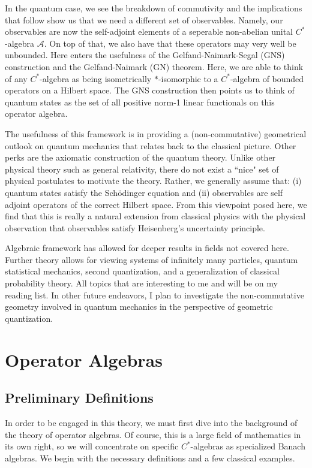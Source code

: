 \documentclass[leqno]{article}
\theoremstyle{definition}
\theoremstyle{remark}
\theoremstyle{theorem}
\begin{document}
In the quantum case, we see the breakdown of commutivity and the implications that follow show us that we need a different set of observables.  Namely, our observables are now the self-adjoint elements of a seperable non-abelian unital $C^*$-algebra $\mathcal{A}$. On top of that, we also have that these operators may very well be unbounded.  Here enters the usefulness of the Gelfand-Naimark-Segal (GNS) construction and the Gelfand-Naimark (GN) theorem.  Here, we are able to think of any $C^*$-algebra as being isometrically $*$-isomorphic to a $C^*$-algebra of bounded operators on a Hilbert space. The GNS construction then points us to think of quantum states as the set of all positive norm-1 linear functionals on this operator algebra. 

The usefulness of this framework is in providing a (non-commutative) geometrical outlook on quantum mechanics that relates back to the classical picture.  Other perks are the axiomatic construction of the quantum theory.  Unlike other physical theory such as general relativity, there do not exist a ``nice" set of physical postulates to motivate the theory.  Rather, we generally assume that: (i) quantum states satisfy the Sch{\"o}dinger equation and (ii) observables are self adjoint operators of the correct Hilbert space. From this viewpoint posed here, we find that this is really a natural extension from classical physics with the physical observation that observables satisfy Heisenberg's uncertainty principle.

Algebraic framework has allowed for deeper results in fields not covered here.  Further theory allows for viewing systems of infinitely many particles, quantum statistical mechanics, second quantization, and a generalization of classical probability theory.  All topics that are interesting to me and will be on my reading list.  In other future endeavors, I plan to investigate the non-commutative geometry involved in quantum mechanics in the perspective of geometric quantization.

\section{Operator Algebras}

\subsection{Preliminary Definitions}
In order to be engaged in this theory, we must first dive into the background of the theory of operator algebras.  Of course, this is a large field of mathematics in its own right, so we will concentrate on specific $C^*$-algebras as specialized Banach algebras.  We begin with the necessary definitions and a few classical examples.  
\end{document}
